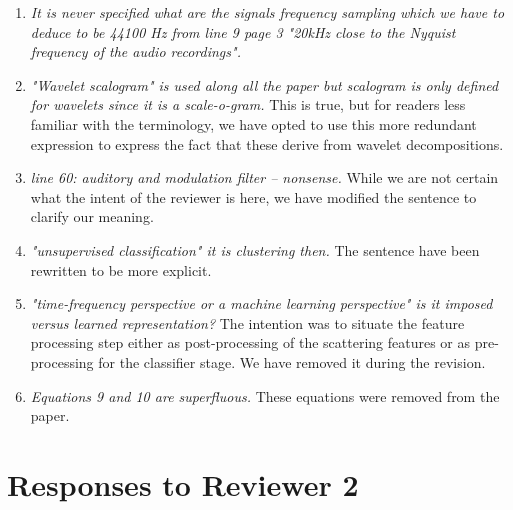 \documentclass[10pt]{article}
\begin{document}
\begin{enumerate}
\item \emph{It is never specified what are the signals frequency sampling which we have to deduce to be 44100 Hz from line 9 page 3 "20kHz close to the Nyquist frequency of the audio recordings".}

\item \emph{"Wavelet scalogram" is used along all the paper but scalogram is only defined for wavelets since 
it is a scale-o-gram.}
This is true, but for readers less familiar with the terminology, we have opted to use this more redundant expression to express the fact that these derive from wavelet decompositions.

\item \emph{line 60: auditory and modulation filter – nonsense.}
While we are not certain what the intent of the reviewer is here, we have modified the sentence to clarify our meaning.

\item \emph{"unsupervised classification" it is clustering then.}
The sentence have been rewritten to be more explicit.

\item \emph{"time-frequency perspective or a machine learning perspective" is it imposed versus learned representation? }
The intention was to situate the feature processing step either as post-processing of the scattering features or as pre-processing for the classifier stage. We have removed it during the revision.

\item \emph{Equations 9 and 10 are superfluous.}
These equations were removed from the paper.

\end{enumerate}

\section{Responses to Reviewer 2}
\end{document}
